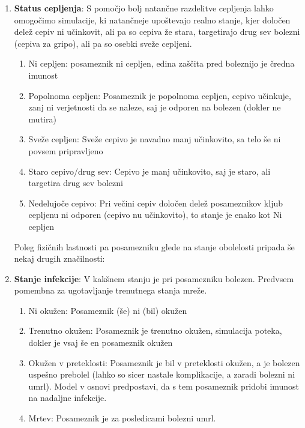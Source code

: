 \documentclass[a4paper, 11pt]{article}
\begin{document}
\begin{enumerate}
\item \textbf{Status cepljenja}: S pomočjo bolj natančne razdelitve cepljenja lahko omogočimo simulacije, ki natančneje upoštevajo realno stanje, kjer določen delež cepiv ni učinkovit, ali pa so cepiva že stara, targetirajo drug sev bolezni (cepiva za gripo), ali pa so osebki sveže cepljeni.
\begin{enumerate}
\item Ni cepljen: posameznik ni cepljen, edina zaščita pred boleznijo je čredna imunost
\item Popolnoma cepljen: Posameznik je popolnoma cepljen, cepivo učinkuje, zanj ni verjetnosti da se naleze, saj je odporen na bolezen (dokler ne mutira)
\item Sveže cepljen: Sveže cepivo je navadno manj učinkovito, sa telo še ni povsem pripravljeno
\item Staro cepivo/drug sev: Cepivo je manj učinkovito, saj je staro, ali targetira drug sev bolezni
\item Nedelujoče cepivo: Pri večini cepiv določen delež posameznikov kljub cepljenu ni odporen (cepivo nu učinkovito), to stanje je enako kot Ni cepljen
\end{enumerate}

Poleg fizičnih lastnosti pa posamezniku glede na stanje obolelosti pripada še nekaj drugih značilnosti:

\item \textbf{Stanje infekcije}: V kakšnem stanju je pri posamezniku bolezen. Predvsem pomembna za ugotavljanje trenutnega stanja mreže.
\begin{enumerate}
\item Ni okužen: Posameznik (še) ni (bil) okužen
\item Trenutno okužen: Posameznik je trenutno okužen, simulacija poteka, dokler je vsaj še en posameznik okužen
\item Okužen v preteklosti: Posameznik je bil v preteklosti okužen, a je bolezen uspešno prebolel (lahko so sicer nastale komplikacije, a zaradi bolezni ni umrl). Model v osnovi predpostavi, da s tem posameznik pridobi imunost na nadaljne infekcije.
\item Mrtev: Posameznik je za posledicami bolezni umrl.
\end{enumerate}


\end{enumerate}
\end{document}
